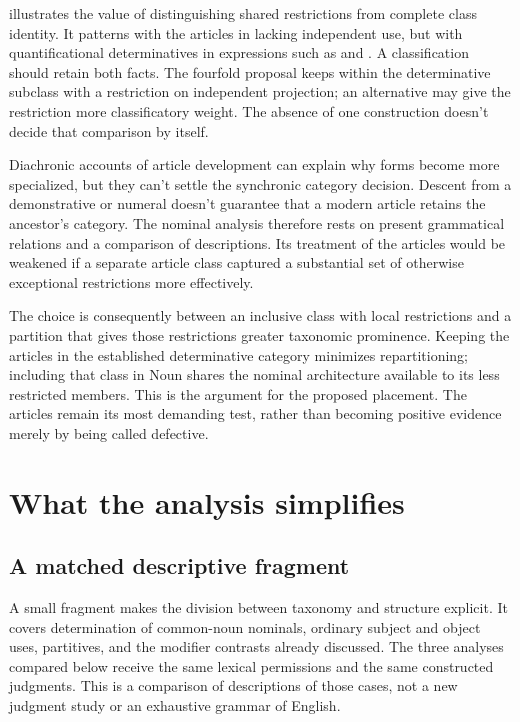 \documentclass[12pt]{article}
\begin{document}
 illustrates the value of distinguishing shared restrictions from complete class identity. It patterns with the articles in lacking independent use, but with quantificational determinatives in expressions such as  and . A classification should retain both facts. The fourfold proposal keeps  within the determinative subclass with a restriction on independent projection; an alternative may give the restriction more classificatory weight. The absence of one construction doesn't decide that comparison by itself.

Diachronic accounts of article development can explain why forms become more specialized, but they can't settle the synchronic category decision. Descent from a demonstrative or numeral doesn't guarantee that a modern article retains the ancestor's category. The nominal analysis therefore rests on present grammatical relations and a comparison of descriptions. Its treatment of the articles would be weakened if a separate article class captured a substantial set of otherwise exceptional restrictions more effectively.

The choice is consequently between an inclusive class with local restrictions and a partition that gives those restrictions greater taxonomic prominence. Keeping the articles in the established determinative category minimizes repartitioning; including that class in Noun shares the nominal architecture available to its less restricted members. This is the argument for the proposed placement. The articles remain its most demanding test, rather than becoming positive evidence merely by being called defective.

\section{What the analysis simplifies}\label{sec:economy}

\subsection{A matched descriptive fragment}\label{sec:fragment}

A small fragment makes the division between taxonomy and structure explicit. It covers determination of common-noun nominals, ordinary subject and object uses, partitives, and the modifier contrasts already discussed. The three analyses compared below receive the same lexical permissions and the same constructed judgments. This is a comparison of descriptions of those cases, not a new judgment study or an exhaustive grammar of English.
\end{document}
